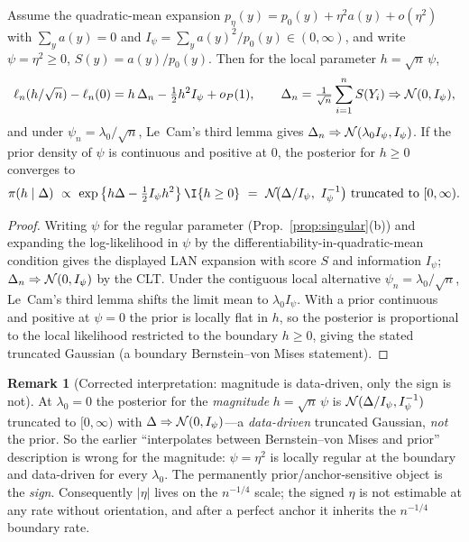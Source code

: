 \documentclass[11pt]{article}
\theoremstyle{plain}
\theoremstyle{definition}\newtheorem{assumption}{Assumption}\newtheorem{remark}{Remark}
\begin{document}
\begin{proposition}\label{prop:boundary}
Assume the quadratic-mean expansion $p_\eta(y)=p_0(y)+\eta^2a(y)+o(\eta^2)$ with $\sum_y a(y)=0$ and
$I_\psi=\sum_y a(y)^2/p_0(y)\in(0,\infty)$, and write $\psi=\eta^2\ge0$, $S(y)=a(y)/p_0(y)$. Then for the local
parameter $h=\sqrt n\,\psi$,
\[
   \ell_n(h/\sqrt n)-\ell_n(0)=h\,\Delta_n-\tfrac12 h^2 I_\psi+o_P(1),\qquad
   \Delta_n=\tfrac1{\sqrt n}\sum_{i=1}^n S(Y_i)\Rightarrow \mathcal{N}(0,I_\psi),
\]
and under $\psi_n=\lambda_0/\sqrt n$, Le~Cam's third lemma gives $\Delta_n\Rightarrow\mathcal{N}(\lambda_0 I_\psi,I_\psi)$.
If the prior density of $\psi$ is continuous and positive at $0$, the posterior for $h\ge0$ converges to
\[
   \pi(h\mid\Delta)\ \propto\ \exp\big\{h\Delta-\tfrac12 I_\psi h^2\big\}\,\I\{h\ge0\}
   \ =\ \N\!\big(\Delta/I_\psi,\ I_\psi^{-1}\big)\ \text{truncated to}\ [0,\infty).
\]
\end{proposition}
\begin{proof}
Writing $\psi$ for the regular parameter (Prop.~\ref{prop:singular}(b)) and expanding the log-likelihood in $\psi$
by the differentiability-in-quadratic-mean condition gives the displayed LAN expansion with score $S$ and
information $I_\psi$; $\Delta_n\Rightarrow\mathcal{N}(0,I_\psi)$ by the CLT. Under the contiguous local alternative
$\psi_n=\lambda_0/\sqrt n$, Le~Cam's third lemma shifts the limit mean to $\lambda_0 I_\psi$. With a prior
continuous and positive at $\psi=0$ the prior is locally flat in $h$, so the posterior is proportional to the local
likelihood restricted to the boundary $h\ge0$, giving the stated truncated Gaussian (a boundary Bernstein--von
Mises statement).
\end{proof}
\begin{remark}[Corrected interpretation: magnitude is data-driven, only the sign is not]
At $\lambda_0=0$ the posterior for the \emph{magnitude} $h=\sqrt n\,\psi$ is $\mathcal{N}(\Delta/I_\psi,I_\psi^{-1})$
truncated to $[0,\infty)$ with $\Delta\Rightarrow\mathcal{N}(0,I_\psi)$---a \emph{data-driven} truncated Gaussian, \emph{not}
the prior. So the earlier ``interpolates between Bernstein--von Mises and prior'' description is wrong for the
magnitude: $\psi=\eta^2$ is locally regular at the boundary and data-driven for every $\lambda_0$. The permanently
prior/anchor-sensitive object is the \emph{sign}. Consequently $|\eta|$ lives on the $n^{-1/4}$ scale; the signed
$\eta$ is not estimable at any rate without orientation, and after a perfect anchor it inherits the $n^{-1/4}$
boundary rate.
\end{remark}
\end{document}
